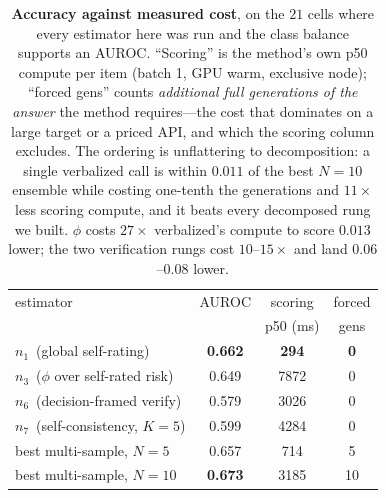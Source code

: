 \documentclass[11pt]{article}
\newcommand{\nverb}{$n_1$}     %
\newcommand{\nphi}{$n_3$}      %
\newcommand{\nyn}{$n_6$}       %
\newcommand{\nsc}{$n_7$}       %
\begin{document}
\begin{table}[t]
\centering\small
\setlength{\tabcolsep}{4pt}
\begin{tabular}{lccc}
\toprule
estimator & AUROC & scoring & forced \\
          &       & p50 (ms) & gens \\
\midrule
\nverb\ (global self-rating)      & \textbf{0.662} & \textbf{294} & \textbf{0} \\
\nphi\ ($\phi$ over self-rated risk) & 0.649 & 7872 & 0 \\
\nyn\ (decision-framed verify)    & 0.579 & 3026 & 0 \\
\nsc\ (self-consistency, $K{=}5$) & 0.599 & 4284 & 0 \\
\midrule
best multi-sample, $N{=}5$        & 0.657 & 714  & 5 \\
best multi-sample, $N{=}10$       & \textbf{0.673} & 3185 & 10 \\
\bottomrule
\end{tabular}
\caption{\textbf{Accuracy against measured cost}, on the $21$ cells where every estimator here
was run and the class balance supports an AUROC. ``Scoring'' is the method's own p50 compute per
item (batch 1, GPU warm, exclusive node); ``forced gens'' counts \emph{additional full
generations of the answer} the method requires---the cost that dominates on a large target or a
priced API, and which the scoring column excludes. The ordering is unflattering to
decomposition: a single verbalized call is within $0.011$ of the best $N{=}10$ ensemble while
costing one-tenth the generations and $11\times$ less scoring compute, and it beats every
decomposed rung we built. $\phi$ costs $27\times$ verbalized's compute to score $0.013$ lower;
the two verification rungs cost $10$--$15\times$ and land $0.06$--$0.08$ lower.}
\label{tab:latauc}
\end{table}
\end{document}
